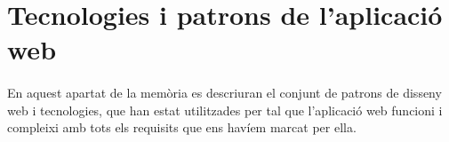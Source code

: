\section{Tecnologies i patrons de l'aplicació web}

    \paragraph{}
    En aquest apartat de la memòria es descriuran el conjunt de patrons de disseny web i tecnologies, que han estat utilitzades per tal que l'aplicació web funcioni i compleixi amb tots els requisits que ens havíem marcat per ella.

    
    
    
    
    
    
    
    
    
    
    
